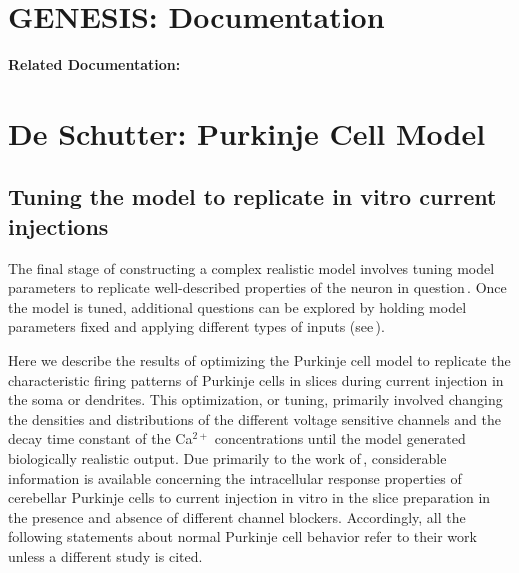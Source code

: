 \documentclass[12pt]{article}
\begin{document}
\section*{GENESIS: Documentation}

{\bf Related Documentation:}

\section*{De Schutter: Purkinje Cell Model}

\subsection*{Tuning the model to replicate in vitro current injections}

The final stage of constructing a complex realistic model involves tuning model parameters to replicate well-described properties of the neuron in question\,\cite{S:1993dz}. Once the model is tuned, additional questions can be explored by holding model parameters fixed and applying different types of inputs (see\,\cite{deschutter94:_purkin_ii}).

Here we  describe the results of optimizing the Purkinje cell model to replicate the characteristic firing patterns of Purkinje cells in slices during current injection in the soma or dendrites. This optimization, or tuning, primarily involved changing the densities and distributions of the different voltage sensitive channels and the decay time constant of the Ca$^{2+}$ concentrations until the model generated biologically realistic output. Due primarily to the work of\,\cite{R:1980ly, R:1980pi}, considerable information is available concerning the intracellular response properties of cerebellar Purkinje cells to current injection in vitro in the slice preparation in the presence and absence of different channel blockers. Accordingly, all the following statements about normal Purkinje cell behavior refer to their work unless a different study is cited.



\end{document}
